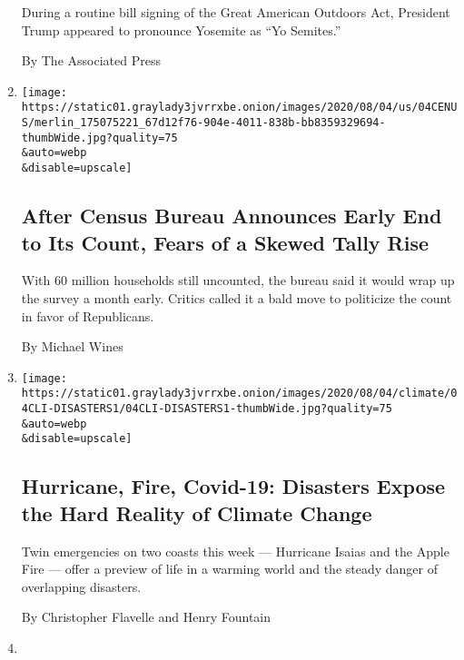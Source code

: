 \begin{enumerate}
  During a routine bill signing of the Great American Outdoors Act,
  President Trump appeared to pronounce Yosemite as ``Yo Semites.''

  By The Associated Press
\item
  \href{/2020/08/04/us/2020-census-ending-early.html}{}

  \texttt{[image: https://static01.graylady3jvrrxbe.onion/images/2020/08/04/us/04CENUS/merlin\_175075221\_67d12f76-904e-4011-838b-bb8359329694-thumbWide.jpg?quality=75\\\&auto=webp\\\&disable=upscale]}

  \hypertarget{after-census-bureau-announces-early-end-to-its-count-fears-of-a-skewed-tally-rise}{%
  \subsection{After Census Bureau Announces Early End to Its Count,
  Fears of a Skewed Tally
  Rise}\label{after-census-bureau-announces-early-end-to-its-count-fears-of-a-skewed-tally-rise}}

  With 60 million households still uncounted, the bureau said it would
  wrap up the survey a month early. Critics called it a bald move to
  politicize the count in favor of Republicans.

  By Michael Wines
\item
  \href{/2020/08/04/climate/hurricane-isaias-apple-fire-climate.html}{}

  \texttt{[image: https://static01.graylady3jvrrxbe.onion/images/2020/08/04/climate/04CLI-DISASTERS1/04CLI-DISASTERS1-thumbWide.jpg?quality=75\\\&auto=webp\\\&disable=upscale]}

  \hypertarget{hurricane-fire-covid-19-disasters-expose-the-hard-reality-of-climate-change}{%
  \subsection{Hurricane, Fire, Covid-19: Disasters Expose the Hard
  Reality of Climate
  Change}\label{hurricane-fire-covid-19-disasters-expose-the-hard-reality-of-climate-change}}

  Twin emergencies on two coasts this week --- Hurricane Isaias and the
  Apple Fire --- offer a preview of life in a warming world and the
  steady danger of overlapping disasters.

  By Christopher Flavelle and Henry Fountain
\item
  \href{/video/us/100000007271780/wyoming-hot-air-balloon-crash.html}{}


\end{enumerate}
